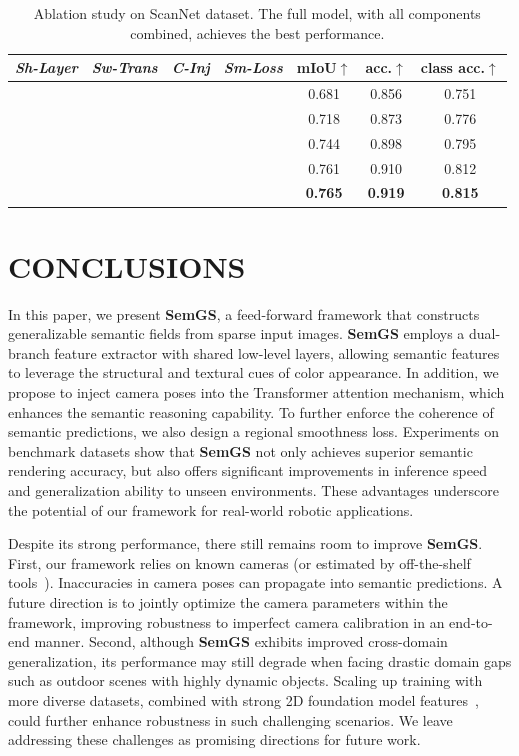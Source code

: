 \documentclass[letterpaper, 10 pt, conference]{ieeeconf}  %
\newcommand{\cmark}{\ding{51}}
\newcommand{\xmark}{\ding{55}}
\begin{document}
\begin{table}[t]
\centering
\caption{Ablation study on ScanNet dataset. The full model, with all components combined, achieves the best performance.}
\renewcommand\arraystretch{1.1}
\setlength{\tabcolsep}{4.5pt}
\begin{tabular}{cccc|ccc}
\toprule
\textit{Sh-Layer} & \textit{Sw-Trans} & \textit{C-Inj} & \textit{Sm-Loss} & mIoU$\uparrow$ & acc.$\uparrow$ & class acc.$\uparrow$ \\
\midrule
\xmark & \xmark & \xmark & \xmark & 0.681 & 0.856 & 0.751 \\
\cmark & \xmark & \xmark & \xmark & 0.718 & 0.873 & 0.776 \\
\cmark & \cmark & \xmark & \xmark & 0.744 & 0.898 & 0.795 \\
\cmark & \cmark & \cmark & \xmark & 0.761 & 0.910 & 0.812 \\
\cmark & \cmark & \cmark & \cmark & \textbf{0.765} & \textbf{0.919} & \textbf{0.815} \\
\bottomrule
\end{tabular}
\label{tab:ablation}
\end{table}

\section{CONCLUSIONS}
In this paper, we present \textbf{SemGS}, a feed-forward framework that constructs generalizable semantic fields from sparse input images.
\textbf{SemGS} employs a dual-branch feature extractor with shared low-level layers, allowing semantic features to leverage the structural and textural cues of color appearance. In addition, we propose to inject camera poses into the Transformer attention mechanism, which enhances the semantic reasoning capability. To further enforce the coherence of semantic predictions, we also design a regional smoothness loss.
Experiments on benchmark datasets show that \textbf{SemGS} not only achieves superior semantic rendering accuracy, but also offers significant improvements in inference speed and generalization ability to unseen environments.
These advantages underscore the potential of our framework for real-world robotic applications.

Despite its strong performance, there still remains room to improve \textbf{SemGS}. First, our framework relies on known cameras (or estimated by off-the-shelf tools~\cite{colmap, vggt}). Inaccuracies in camera poses can propagate into semantic predictions. A future direction is to jointly optimize the camera parameters within the framework, improving robustness to imperfect camera calibration in an end-to-end manner. Second, although \textbf{SemGS} exhibits improved cross-domain generalization, its performance may still degrade when facing drastic domain gaps such as outdoor scenes with highly dynamic objects. Scaling up training with more diverse datasets, combined with strong 2D foundation model features~\cite{clip, sam}, could further enhance robustness in such challenging scenarios. We leave addressing these challenges as promising directions for future work.
\end{document}
